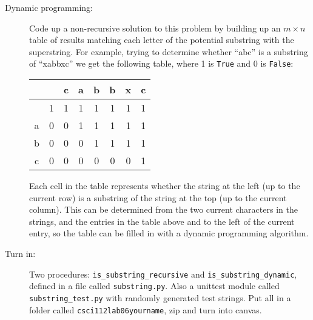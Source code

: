 \documentclass{article}
\begin{document}
\begin{description}
\item[Dynamic programming:] Code up a non-recursive
solution to this problem by building up an $m\times n$ table of results
matching each letter of the potential substring with the superstring.
For example, trying to determine whether ``abc'' is  a substring
of ``xabbxc'' we get the following table, where 1 is {\tt True} 
and 0 is {\tt False}:

\begin{tabular}{cccccccc}
  &    & c & a & b& b & x & c \\\hline
  & 1 & 1 & 1 & 1 & 1 & 1 & 1 \\
a & 0 & 0 & 1 & 1 & 1 & 1 & 1 \\
b & 0 & 0 & 0 & 1 & 1 & 1 & 1 \\
c & 0 & 0 & 0 & 0 & 0 & 0 & 1 \\
\end{tabular}

Each cell in the table represents whether the string at the left
(up to the current row) is a substring of the string at the top
(up to the current column).  This can be determined from
the two current characters in the strings, and the entries
in the table above and to the left of the current entry, so
the table can be filled in with a dynamic programming 
algorithm.

\item[Turn in:]  Two procedures: \verb|is_substring_recursive|
and \verb|is_substring_dynamic|, defined in a file called \verb|substring.py|.
Also a unittest module called \verb|substring_test.py|
with randomly generated test strings.  Put all in a folder
called \verb|csci112lab06yourname|, zip and turn into canvas.

\end{description}
\end{document}
